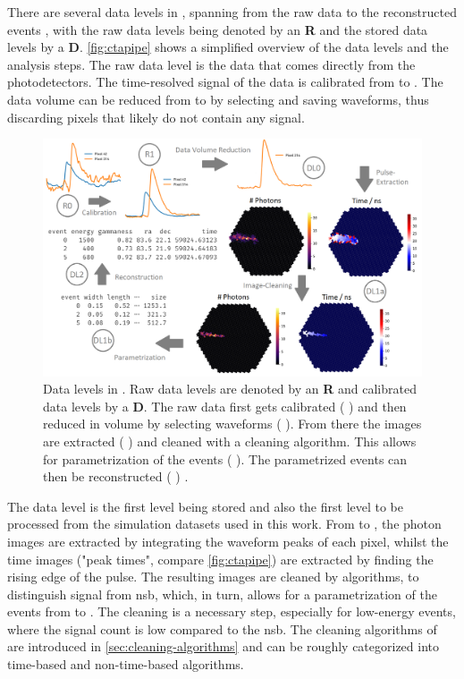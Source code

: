 There are several data levels in \ctapipe{}, spanning from the raw data \rzero{} to the reconstructed events
\dlt{}, with the raw data levels being denoted by an \textbf{R} and the stored data levels by a \textbf{D}.
\autoref{fig:ctapipe} shows a simplified overview of the data levels and the analysis steps.
The raw data level \rzero{} is the data that comes directly from the photodetectors. The time-resolved
signal of the data is calibrated from \rzero{} to \rone{}. The data volume can be reduced
from \rone{} to \dlz{} by selecting and saving waveforms, thus discarding pixels that likely do not contain
any signal.
\begin{figure}
    \centering
    \includegraphics[width=\textwidth]{graphics/ctapipe.png}
    \caption{Data levels in \ctapipe{}. Raw data levels are denoted by an \textbf{R} and calibrated
    data levels by a \textbf{D}. The raw data first gets calibrated (\rzero{} \rightarrow \rone{})
    and then reduced in volume by selecting waveforms (\rone{} \rightarrow \dlz{}). From there the
    images are extracted (\dlz{} \rightarrow \dloa{}) and cleaned with a cleaning algorithm. This
    allows for parametrization of the events (\dloa{} \rightarrow \dlob{}). The parametrized events
    can then be reconstructed (\dlob{} \rightarrow \dlt{}) \cite{noethe_thesis, hackfeld}.}
    \label{fig:ctapipe}
\end{figure}

The \dlz{} data level is the first level being stored and also the first level to be processed from
the simulation datasets used in this work. From \dlz{} to \dloa{}, the photon images are extracted
by integrating the waveform peaks of each pixel, whilst the time images ("peak times", compare \autoref{fig:ctapipe})
are extracted by finding the rising edge of the pulse. The resulting images are cleaned by algorithms,
to distinguish signal from \gls{nsb}, which, in turn, allows for a parametrization of the events from \dloa{} to \dlob{}.
The cleaning is a necessary step, especially for
low-energy events, where the signal count is low compared to the \gls{nsb}. The cleaning algorithms
of \ctapipe{} are introduced in \autoref{sec:cleaning-algorithms} and can be roughly categorized into
time-based and non-time-based algorithms.

